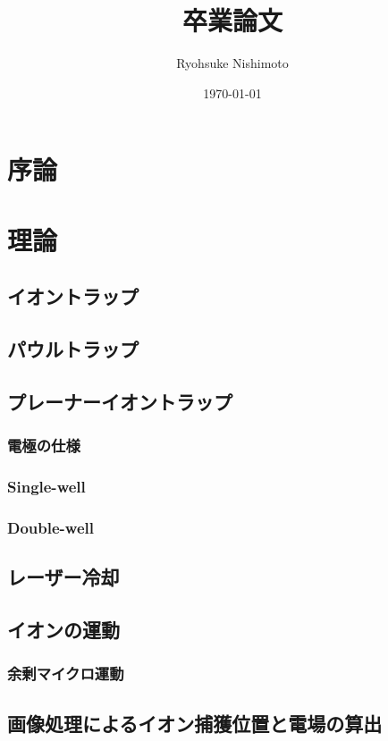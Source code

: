 \documentclass[a4j,10.5pt,titlepage]{jarticle}
\title{卒業論文}
\author{Ryohsuke Nishimoto}
\date{\today}
\begin{document}
\maketitle
{}
\setcounter{tocdepth}{3}
\tableofcontents

\clearpage
{}

\section{序論}
	
\section{理論}
	\subsection{イオントラップ}
	\subsection{パウルトラップ}
	\subsection{プレーナーイオントラップ}
		\subsubsection{電極の仕様}
		\subsubsection{Single-well}
		\subsubsection{Double-well}
	\subsection{レーザー冷却}
	\subsection{イオンの運動}
		\subsubsection{余剰マイクロ運動}
	\subsection{画像処理によるイオン捕獲位置と電場の算出}
\end{document}
